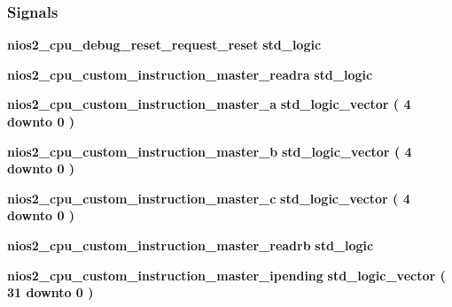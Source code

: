 \subsubsection*{Signals}
 \begin{DoxyCompactItemize}
\item 
{\bf nios2\+\_\+cpu\+\_\+debug\+\_\+reset\+\_\+request\+\_\+reset} {\bfseries \textcolor{comment}{std\+\_\+logic}\textcolor{vhdlchar}{ }} 
\item 
{\bf nios2\+\_\+cpu\+\_\+custom\+\_\+instruction\+\_\+master\+\_\+readra} {\bfseries \textcolor{comment}{std\+\_\+logic}\textcolor{vhdlchar}{ }} 
\item 
{\bf nios2\+\_\+cpu\+\_\+custom\+\_\+instruction\+\_\+master\+\_\+a} {\bfseries \textcolor{comment}{std\+\_\+logic\+\_\+vector}\textcolor{vhdlchar}{ }\textcolor{vhdlchar}{(}\textcolor{vhdlchar}{ }\textcolor{vhdlchar}{ } \textcolor{vhdldigit}{4} \textcolor{vhdlchar}{ }\textcolor{keywordflow}{downto}\textcolor{vhdlchar}{ }\textcolor{vhdlchar}{ } \textcolor{vhdldigit}{0} \textcolor{vhdlchar}{ }\textcolor{vhdlchar}{)}\textcolor{vhdlchar}{ }} 
\item 
{\bf nios2\+\_\+cpu\+\_\+custom\+\_\+instruction\+\_\+master\+\_\+b} {\bfseries \textcolor{comment}{std\+\_\+logic\+\_\+vector}\textcolor{vhdlchar}{ }\textcolor{vhdlchar}{(}\textcolor{vhdlchar}{ }\textcolor{vhdlchar}{ } \textcolor{vhdldigit}{4} \textcolor{vhdlchar}{ }\textcolor{keywordflow}{downto}\textcolor{vhdlchar}{ }\textcolor{vhdlchar}{ } \textcolor{vhdldigit}{0} \textcolor{vhdlchar}{ }\textcolor{vhdlchar}{)}\textcolor{vhdlchar}{ }} 
\item 
{\bf nios2\+\_\+cpu\+\_\+custom\+\_\+instruction\+\_\+master\+\_\+c} {\bfseries \textcolor{comment}{std\+\_\+logic\+\_\+vector}\textcolor{vhdlchar}{ }\textcolor{vhdlchar}{(}\textcolor{vhdlchar}{ }\textcolor{vhdlchar}{ } \textcolor{vhdldigit}{4} \textcolor{vhdlchar}{ }\textcolor{keywordflow}{downto}\textcolor{vhdlchar}{ }\textcolor{vhdlchar}{ } \textcolor{vhdldigit}{0} \textcolor{vhdlchar}{ }\textcolor{vhdlchar}{)}\textcolor{vhdlchar}{ }} 
\item 
{\bf nios2\+\_\+cpu\+\_\+custom\+\_\+instruction\+\_\+master\+\_\+readrb} {\bfseries \textcolor{comment}{std\+\_\+logic}\textcolor{vhdlchar}{ }} 
\item 
{\bf nios2\+\_\+cpu\+\_\+custom\+\_\+instruction\+\_\+master\+\_\+ipending} {\bfseries \textcolor{comment}{std\+\_\+logic\+\_\+vector}\textcolor{vhdlchar}{ }\textcolor{vhdlchar}{(}\textcolor{vhdlchar}{ }\textcolor{vhdlchar}{ } \textcolor{vhdldigit}{31} \textcolor{vhdlchar}{ }\textcolor{keywordflow}{downto}\textcolor{vhdlchar}{ }\textcolor{vhdlchar}{ } \textcolor{vhdldigit}{0} \textcolor{vhdlchar}{ }\textcolor{vhdlchar}{)}\textcolor{vhdlchar}{ }} 

\end{DoxyCompactItemize}
